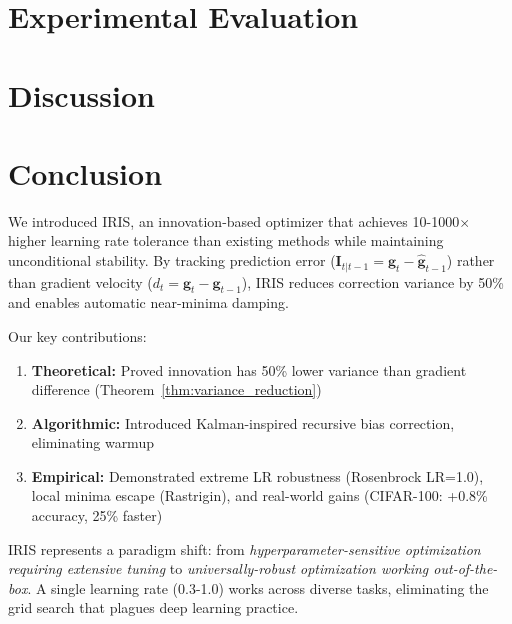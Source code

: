 \documentclass[11pt]{article}
\newcommand{\g}{\mathbf{g}}
\newcommand{\ghat}{\widehat{\mathbf{g}}}
\newcommand{\Innovation}{\mathbf{I}}
\begin{document}
\section{Experimental Evaluation}
\label{sec:experiments}


\section{Discussion}
\label{sec:discussion}


\section{Conclusion}
\label{sec:conclusion}

We introduced IRIS, an innovation-based optimizer that achieves 10-1000$\times$ higher learning rate tolerance than existing methods while maintaining unconditional stability. By tracking prediction error ($\Innovation_{t|t-1} = \g_t - \ghat_{t-1}$) rather than gradient velocity ($d_t = \g_t - \g_{t-1}$), IRIS reduces correction variance by 50\% and enables automatic near-minima damping.

Our key contributions:
\begin{enumerate}
    \item \textbf{Theoretical:} Proved innovation has 50\% lower variance than gradient difference (Theorem~\ref{thm:variance_reduction})
    \item \textbf{Algorithmic:} Introduced Kalman-inspired recursive bias correction, eliminating warmup
    \item \textbf{Empirical:} Demonstrated extreme LR robustness (Rosenbrock LR=1.0), local minima escape (Rastrigin), and real-world gains (CIFAR-100: +0.8\% accuracy, 25\% faster)
\end{enumerate}

IRIS represents a paradigm shift: from \emph{hyperparameter-sensitive optimization requiring extensive tuning} to \emph{universally-robust optimization working out-of-the-box}. A single learning rate (0.3-1.0) works across diverse tasks, eliminating the grid search that plagues deep learning practice.
\end{document}
